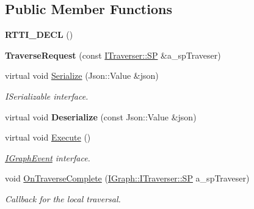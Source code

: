 \subsection*{Public Member Functions}
\begin{DoxyCompactItemize}
\item 
\mbox{\label{struct_graph_connector_1_1_traverse_request_a85516ac96617ca7aaa2ab4dd846c5b24}} 
{\bfseries R\+T\+T\+I\+\_\+\+D\+E\+CL} ()
\item 
\mbox{\label{struct_graph_connector_1_1_traverse_request_a3a493fe79a8ad0383d6253ec75ec9863}} 
{\bfseries Traverse\+Request} (const \hyperlink{class_i_graph_1_1_i_traverser_a5a5ccc81423d6024742d1898a310d812}{I\+Traverser\+::\+SP} \&a\+\_\+sp\+Traveser)
\item 
\mbox{\label{struct_graph_connector_1_1_traverse_request_a2e3ab7a5a7be7f1518e0b111532e3aa2}} 
virtual void \hyperlink{struct_graph_connector_1_1_traverse_request_a2e3ab7a5a7be7f1518e0b111532e3aa2}{Serialize} (Json\+::\+Value \&json)
\begin{DoxyCompactList}\small\item\em I\+Serializable interface. \end{DoxyCompactList}\item 
\mbox{\label{struct_graph_connector_1_1_traverse_request_aea4cff47d9da288e25c7b8df23307bc9}} 
virtual void {\bfseries Deserialize} (const Json\+::\+Value \&json)
\item 
\mbox{\label{struct_graph_connector_1_1_traverse_request_a911d89d56086afa48b92e26f1023c3f5}} 
virtual void \hyperlink{struct_graph_connector_1_1_traverse_request_a911d89d56086afa48b92e26f1023c3f5}{Execute} ()
\begin{DoxyCompactList}\small\item\em \hyperlink{struct_graph_connector_1_1_i_graph_event}{I\+Graph\+Event} interface. \end{DoxyCompactList}\item 
\mbox{\label{struct_graph_connector_1_1_traverse_request_ad5e3febde69fdc0e446c554e0cdd50d8}} 
void \hyperlink{struct_graph_connector_1_1_traverse_request_ad5e3febde69fdc0e446c554e0cdd50d8}{On\+Traverse\+Complete} (\hyperlink{class_i_graph_1_1_i_traverser_a5a5ccc81423d6024742d1898a310d812}{I\+Graph\+::\+I\+Traverser\+::\+SP} a\+\_\+sp\+Traveser)
\begin{DoxyCompactList}\small\item\em Callback for the local traversal. \end{DoxyCompactList}\end{DoxyCompactItemize}

